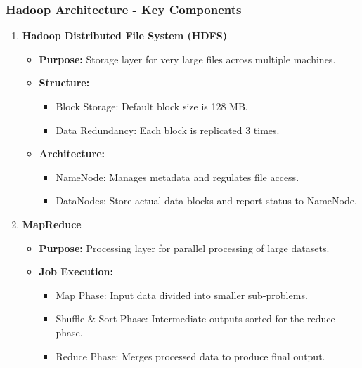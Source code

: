 \documentclass{beamer}
\begin{document}
\begin{frame}[fragile]
    \frametitle{Hadoop Architecture - Key Components}
    \begin{enumerate}
        \item \textbf{Hadoop Distributed File System (HDFS)}
        \begin{itemize}
            \item \textbf{Purpose:} Storage layer for very large files across multiple machines.
            \item \textbf{Structure:}
            \begin{itemize}
                \item Block Storage: Default block size is 128 MB.
                \item Data Redundancy: Each block is replicated 3 times.
            \end{itemize}
            \item \textbf{Architecture:}
            \begin{itemize}
                \item NameNode: Manages metadata and regulates file access.
                \item DataNodes: Store actual data blocks and report status to NameNode.
            \end{itemize}
        \end{itemize}

        \item \textbf{MapReduce}
        \begin{itemize}
            \item \textbf{Purpose:} Processing layer for parallel processing of large datasets.
            \item \textbf{Job Execution:}
            \begin{itemize}
                \item Map Phase: Input data divided into smaller sub-problems.
                \item Shuffle \& Sort Phase: Intermediate outputs sorted for the reduce phase.
                \item Reduce Phase: Merges processed data to produce final output.
            \end{itemize}
        \end{itemize}
    \end{enumerate}
\end{frame}
\end{document}
